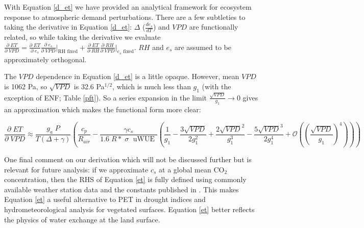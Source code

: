 \documentclass[draft,linenumbers]{agujournal}
\begin{document}
With Equation \ref{d_et} we have provided an analytical framework for ecosystem response to atmospheric demand perturbations. There are a few subtleties to taking the derivative in Equation \ref{d_et}: $\Delta$ ($\frac{d e_{s}}{d T}$) and $VPD$ are functionally related, so while taking the derivative we evaluate $\frac{\partial \; ET}{\partial \; VPD} = \frac{\partial \; ET} {\partial \; e_s} \frac{\partial \; e_s}{\partial \; VPD} \Big|_{\text{RH fixed}} + \frac{\partial \; ET}{\partial \; RH} \frac{\partial \; RH}{\partial \; VPD} \Big|_{\text{$e_s$ fixed}}$. $RH$ and $e_s$ are assumed to be approximately orthogonal.



The $VPD$ dependence in Equation \ref{d_et} is a little opaque. However, mean $VPD$ is 1062 Pa, so $\sqrt{VPD}$ is 32.6 Pa$^{1/2}$, which is much less than $g_1$ (with the exception of ENF; Table \ref{pft}). So a series expansion in the limit $\frac{\sqrt{VPD}}{g_1} \to 0$ gives an approximation which makes the functional form more clear: 

\begin{linenomath*}
  \begin{equation}
    \frac{\partial \;  ET}{\partial \; VPD} \approx \frac{g_a \; P}{T(\Delta + \gamma)}   \left(\frac{ c_p}{R_{air}} -  \frac{\gamma c_s }{1.6 \; R*\; \sigma \; \text{ uWUE }} \left( \frac{1}{g_{1}} - \frac{3 \sqrt{VPD}}{2 g_{1}^{2}} + \frac{2 \sqrt{VPD}^{2}}{g_{1}^{3}} - \frac{5 \sqrt{VPD}^{3}}{2 g_{1}^{4}} + \mathcal{O}\left(\left(\frac{\sqrt{VPD}}{g_1}\right)^{4}\right) \right) \right)
    \label{d_et_approx}
  \end{equation}
\end{linenomath*}

One final comment on our derivation which will not be discussed further but is relevant for future analysis: if we  approximate $c_s$ at a global mean CO$_2$ concentration, then the RHS of Equation \ref{et} is fully defined using commonly available weather station data and the constants published in \citet{Zhou_2015, Lin_2015}. This makes Equation \ref{et} a useful alternative to PET in drought indices and hydrometeorological analysis for vegetated surfaces. Equation \ref{et} better reflects the physics of water exchange at the land surface. 
\end{document}
